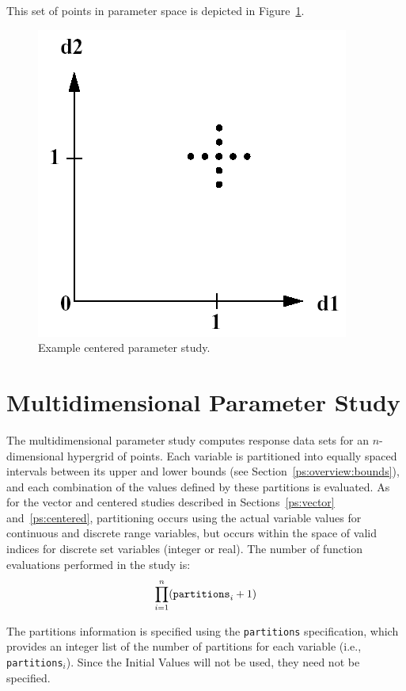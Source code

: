 This set of points in parameter space is depicted in Figure~\ref{ps:figure01}.
\begin{figure}
  \centering
  \includegraphics[scale=0.5]{images/centered_pstudy}
  \caption{Example centered parameter study.}
  \label{ps:figure01}
\end{figure}


\section{Multidimensional Parameter Study}\label{ps:multidimensional}

The multidimensional parameter study computes response data sets for
an $n$-dimensional hypergrid of points. Each variable is partitioned
into equally spaced intervals between its upper and lower bounds (see
Section~\ref{ps:overview:bounds}), and each combination of the values
defined by these partitions is evaluated.  As for the vector and
centered studies described in Sections~\ref{ps:vector}
and~\ref{ps:centered}, partitioning occurs using the actual variable
values for continuous and discrete range variables, but occurs within
the space of valid indices for discrete set variables (integer or
real).  The number of function evaluations performed in the study is:
\begin{equation}
  \prod_{i=1}^{n}(\hbox{\texttt{partitions}}_{i}+1)
  \label{ps:equation01}
\end{equation}

The partitions information is specified using the \texttt{partitions}
specification, which provides an integer list of the number of
partitions for each variable (i.e., \texttt{partitions}$_{i}$). Since
the Initial Values will not be used, they need not be specified.

